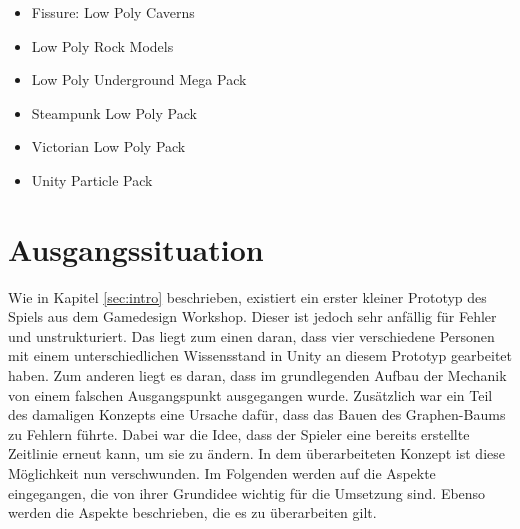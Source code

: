 
\begin{itemize}  
    \item Fissure: Low Poly Caverns \cite{noauthor_fissure_nodate}
    \item Low Poly Rock Models \cite{noauthor_low_lprm}
    \item Low Poly Underground Mega Pack \cite{noauthor_low_nodate}
    \item Steampunk Low Poly Pack \cite{noauthor_steampunk_lp}
    \item Victorian Low Poly Pack \cite{noauthor_victorian_nodate}
    \item Unity Particle Pack \cite{noauthor_unity_nodate}
\end{itemize}


\section{Ausgangssituation}
Wie in Kapitel \ref{sec:intro}  beschrieben, existiert ein erster kleiner Prototyp des Spiels aus dem Gamedesign Workshop. Dieser ist jedoch sehr anfällig für Fehler und unstrukturiert. Das liegt zum einen daran, dass vier verschiedene Personen mit einem unterschiedlichen Wissensstand in Unity an diesem Prototyp gearbeitet haben. Zum anderen liegt es daran, dass im grundlegenden Aufbau der Mechanik von einem falschen Ausgangspunkt ausgegangen wurde. Zusätzlich war ein Teil des damaligen Konzepts eine Ursache dafür, dass das Bauen des Graphen-Baums zu Fehlern führte. Dabei war die Idee, dass der Spieler eine bereits erstellte Zeitlinie erneut  kann, um sie zu ändern. In dem überarbeiteten Konzept ist diese Möglichkeit nun verschwunden. Im Folgenden werden auf die Aspekte eingegangen, die von ihrer Grundidee wichtig für die Umsetzung sind. Ebenso werden die  Aspekte beschrieben, die es zu überarbeiten gilt.
